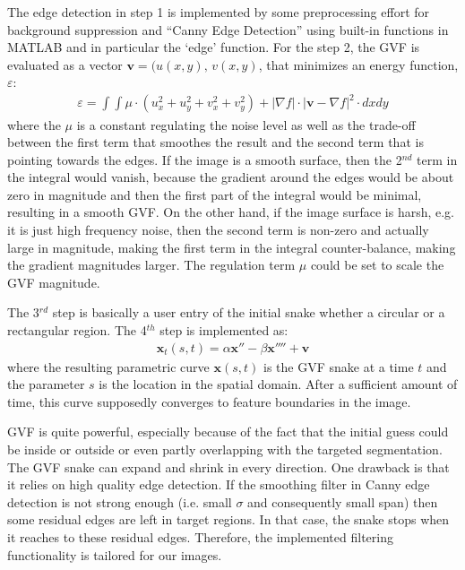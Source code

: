 \documentclass{article}
\begin{document}
The edge detection in step 1 is implemented by some preprocessing effort for background suppression and ``Canny Edge Detection'' using built-in functions in MATLAB and in particular the `edge' function. For the step 2, the GVF is evaluated as a vector $\mathbf{v}=(u(x,y),\, v(x,y)$, that minimizes an energy function, $\varepsilon$:
\begin{align*}
\varepsilon = \int \int \mu \cdot (u_x^2 +u_y^2+v_x^2+v_y^2)+|\nabla f|\cdot |\mathbf{v}-\nabla f|^2 \cdot dxdy
\end{align*}
where the $\mu$ is a constant regulating the noise level as well as the trade-off between the first term that smoothes the result and the second term that is pointing towards the edges. If the image is a smooth surface, then the 2$^{nd}$ term in the integral would vanish, because the gradient around the edges would be about zero in magnitude and then the first part of the integral would be minimal, resulting in a smooth GVF. On the other hand, if the image surface is harsh, e.g. it is just high frequency noise, then the second term is non-zero and actually large in magnitude, making the first term in the integral counter-balance, making the gradient magnitudes larger. The regulation term $\mu$ could be set to scale the GVF magnitude.

The 3$^{rd}$ step is basically a user entry of the initial snake whether a circular or a rectangular region. The 4$^{th}$ step is implemented as:
\begin{align*}
\mathbf{x}_t(s,t) = \alpha \mathbf{x}'' - \beta \mathbf{x}'''' + \mathbf{v}
\end{align*}
where the resulting parametric curve $\mathbf{x}(s,t)$ is the GVF snake at a time $t$ and the parameter $s$ is the location in the spatial domain. After a sufficient amount of time, this curve supposedly converges to feature boundaries in the image.

GVF is quite powerful, especially because of the fact that the initial guess could be inside or outside or even partly overlapping with the targeted segmentation. The GVF snake can expand and shrink in every direction. One drawback is that it relies on high quality edge detection. If the smoothing filter in Canny edge detection is not strong enough (i.e. small $\sigma$ and consequently small span) then some residual edges are left in target regions. In that case, the snake stops when it reaches to these residual edges. Therefore, the implemented filtering functionality is tailored for our images.
\end{document}
